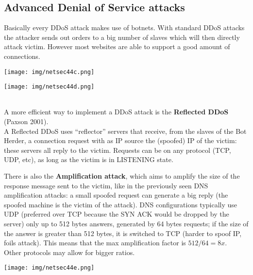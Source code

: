 \documentclass[a4paper, 10pt, titlepage]{article}
\begin{document}
\subsection{Advanced Denial of Service attacks}
Basically every DDoS attack makes use of botnets. With standard DDoS attacks the attacker sends out orders to a big number of slaves which will then directly attack victim. However most websites are able to support a good amount of connections.\medskip\\
\begin{minipage}{0.48\textwidth} 
\begin{center}
	\texttt{[image: img/netsec44c.png]}
\end{center}
\end{minipage}
\hfill \vline
\begin{minipage}{0.5\textwidth}
	\begin{center}
		\texttt{[image: img/netsec44d.png]}
	\end{center}
\end{minipage} \medskip\\
A more efficient way to implement a DDoS attack is the \textbf{Reflected DDoS} (Paxson 2001). \\
A Reflected DDoS uses “reflector” servers that receive, from the slaves of the Bot Herder, a connection request with as IP source the (spoofed) IP of the victim: these servers all reply to the victim. Requests can be on any protocol (TCP, UDP, etc), as long as the victim is in LISTENING state. \medskip\\
\begin{minipage}{0.65\textwidth} 
There is also the \textbf{Amplification attack}, which aims to amplify the size of the response message sent to the victim, like in the previously seen DNS amplification attacks: a small spoofed request can generate a big reply (the spoofed machine is the victim of the attack). DNS configurations typically use UDP (preferred over TCP because the SYN ACK would be dropped by the server) only up to 512 bytes answers, generated by 64 bytes requests; if the size of the answer is greater than 512 bytes, it is switched to TCP (harder to spoof IP, foils attack). This means that the max amplification factor is $512/64=8x$.\\ Other protocols may allow for bigger ratios.

\end{minipage}
\hfill
\begin{minipage}{0.35\textwidth}
	\begin{center}
		\texttt{[image: img/netsec44e.png]}
	\end{center}
\end{minipage}
\end{document}
